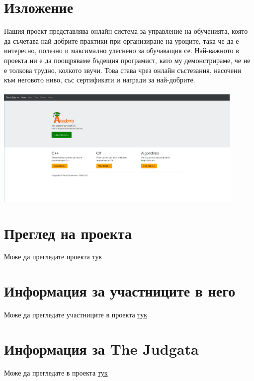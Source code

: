 \documentclass[12pt]{article}
\begin{document}
	\section{Изложение}
	Нашия проект представлява онлайн система за управление на обученията, която да съчетава най-добрите практики при организиране на уроците, така че да е интересно, полезно и максимално улеснено за обучаващия се. Най-важното в проекта ни е да поощряваме бъдещия програмист, като му демонстрираме, че не е толкова трудно, колкото звучи. Това става чрез онлайн състезания, насочени към неговото ниво, със сертификати и награди за най-добрите. \\\vspace {3cm} \\
	\includegraphics[width=0.9\textwidth]{academy} \\
	\section{Преглед на проекта}
	Може да прегледате проекта \href{https://infocourse.techedu.cf}{тук} 
	\section{Информация за участниците в него}
	Може да прегледате участниците в проекта \href{https://techedu.cf}{тук} 
	\section{Информация за \foreignlanguage{english}{The Judgata}}
	Може да прегледате  в проекта \href{https://judge.techedu.cf}{тук} 
	\newpage
\end{document}
